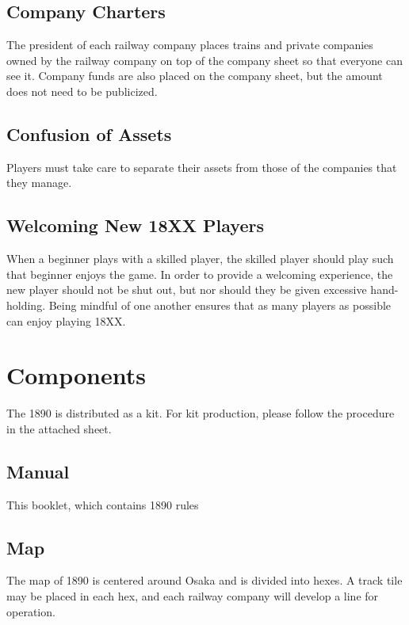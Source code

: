 \documentclass{article}
\begin{document}
\begin{CJK}{UTF8}{min}
\begin{multicols}{2}
\subsection{Company Charters}
\label{company-charters}
The president of each railway company places trains and private
companies owned by the railway company on top of the company sheet so
that everyone can see it. Company funds are also placed on the company
sheet, but the amount does not need to be publicized.


\subsection{Confusion of Assets}
Players must take care to separate their assets from those of the
companies that they manage.


\subsection{Welcoming New 18XX Players}
When a beginner plays with a skilled player, the skilled player should
play such that beginner enjoys the game. In order to provide a
welcoming experience, the new player should not be shut out, but nor
should they be given excessive hand-holding. Being mindful of one
another ensures that as many players as possible can enjoy playing
18XX.


\section{Components}
The 1890 is distributed as a kit. For kit production, please follow
the procedure in the attached sheet.

\subsection{Manual}
This booklet, which contains 1890 rules

\subsection{Map}
The map of 1890 is centered around Osaka and is divided into
hexes. A track tile may be placed in each hex, and each
railway company will develop a line for operation.


\end{multicols}
\end{CJK}
\end{document}
